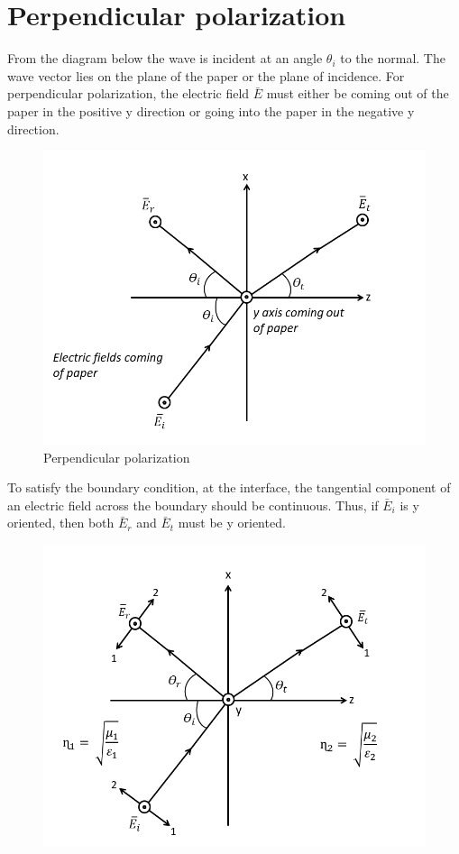 \section{Perpendicular polarization} 
From the diagram below the wave is incident at an angle $\theta_{i}$ to the normal. The wave vector lies on the plane of the paper or the plane of incidence. For perpendicular polarization, the electric field $\bar{E}$ must either be coming out of the paper in the positive y direction or going into the paper in the negative y direction.
\begin{figure}[h]
\centering
\includegraphics[width=1\linewidth]{./graphics/perpendicular_polarization1}
\caption{Perpendicular polarization}
\label{fig:12}
\end{figure}

To satisfy the boundary condition, at the interface, the tangential component of an electric field across the boundary should be continuous. Thus, if $\bar{E}_{i}$ is y oriented, then both  $\bar{E}_{r}$ and  $\bar{E}_{t}$ must be y oriented.
\begin{figure}[h]
\centering
\includegraphics[scale=0.44]{./graphics/perpendicular_polarization2}
\caption{}
\label{fig:13}
\end{figure}

